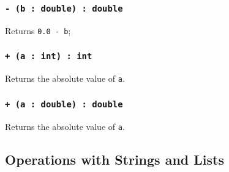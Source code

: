 \subsubsection{\texttt{- (b : double) : double}}

Returns \texttt{0.0 - b};

\subsubsection{\texttt{+ (a : int) : int}}

Returns the absolute value of \texttt{a}.

\subsubsection{\texttt{+ (a : double) : double}}

Returns the absolute value of \texttt{a}.

\subsection{Operations with Strings and Lists}

